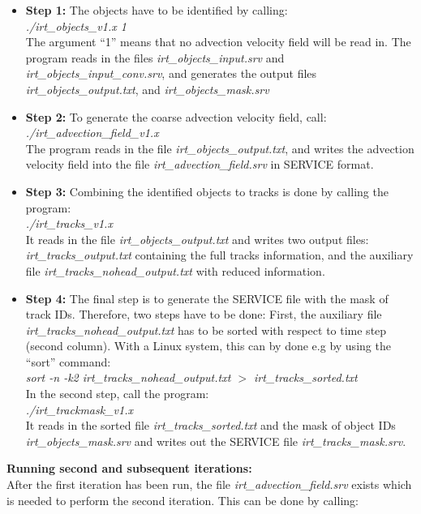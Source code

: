 \documentclass[11pt]{article}
\begin{document}
\begin{itemize}
\item {\bf Step 1:} The objects have to be identified by calling:\\
{\it ./irt\_objects\_v1.x 1}\\
The argument ``1'' means that no advection velocity field will be read in. The program reads in the files {\it irt\_objects\_input.srv} and {\it irt\_objects\_input\_conv.srv}, and generates the output files {\it irt\_objects\_output.txt}, and {\it irt\_objects\_mask.srv}
\item {\bf Step 2:} To generate the coarse advection velocity field, call:\\
{\it ./irt\_advection\_field\_v1.x}\\
The program reads in the file {\it irt\_objects\_output.txt}, and writes the advection velocity field into the file {\it irt\_advection\_field.srv} in SERVICE format.
\item {\bf Step 3:} Combining the identified objects to tracks is done by calling the program:\\
{\it ./irt\_tracks\_v1.x}\\
It reads in the file {\it irt\_objects\_output.txt} and writes two output files: {\it irt\_tracks\_output.txt} containing the full tracks information, and the auxiliary file {\it irt\_tracks\_nohead\_output.txt} with reduced information.
\item {\bf Step 4:} The final step is to generate the SERVICE file with the mask of track IDs. Therefore, two steps have to be done: First, the auxiliary file {\it irt\_tracks\_nohead\_output.txt} has to be sorted with respect to time step (second column). With a Linux system, this can by done e.g by using the ``sort'' command:\\
{\it sort -n -k2 irt\_tracks\_nohead\_output.txt $>$ irt\_tracks\_sorted.txt}\\
In the second step, call the program:\\
{\it ./irt\_trackmask\_v1.x}\\
It reads in the sorted file {\it irt\_tracks\_sorted.txt} and the mask of object IDs {\it irt\_objects\_mask.srv} and writes out the SERVICE file {\it irt\_tracks\_mask.srv}.
\end{itemize}\vspace{0.5cm}
{\bf Running second and subsequent iterations:}\\
After the first iteration has been run, the file {\it irt\_advection\_field.srv} exists which is needed to perform the second iteration. This can be done by calling:
\end{document}
